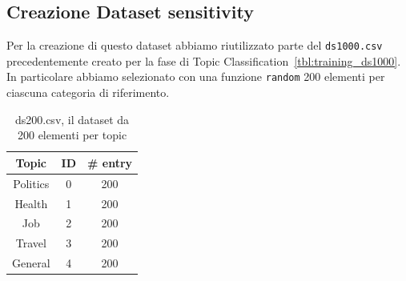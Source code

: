 \subsection{Creazione Dataset sensitivity}
\label{ssec:create_sens_ds}
Per la creazione di questo dataset abbiamo riutilizzato parte del {\tt ds1000.csv} precedentemente creato per la fase di Topic Classification~\ref{tbl:training_ds1000}. In particolare abbiamo selezionato con una funzione {\tt random} 200 elementi per ciascuna categoria di riferimento.

\begin{table}[h!t]
    \centering
    \begin{tabular}{c|c|c}
    \hline
        \textbf{Topic} & \textbf{ID} & \textbf{\# entry} \\ \hline
        Politics & 0 & 200 \\ \hline
        Health & 1 & 200 \\ \hline
        Job & 2 & 200 \\ \hline
        Travel & 3 & 200 \\ \hline
        General & 4 & 200 \\ \hline
    \end{tabular}
    \caption{ds200.csv, il dataset da 200 elementi per topic}
    \label{tab:ds200.csv}
\end{table}
\FloatBarrier

